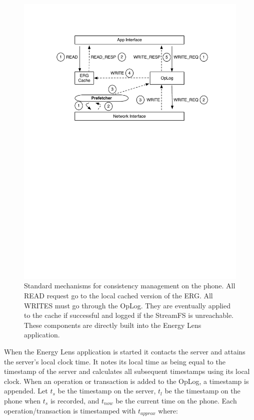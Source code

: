 \begin{figure}[htb!]
\begin{center}
\includegraphics[scale=0.80]{figs/standard_interaction}
\caption{Standard mechanisms for consistency management on the phone.  All READ request go to the local
cached version of the ERG.  All WRITES must go through the OpLog.
They are eventually applied to the cache
if successful and logged if the StreamFS is unreachable.  These components are directly built into the 
Energy Lens application.}
\label{fig:interactions}
\end{center}
\end{figure}

\label{sec:conflicts}
When the Energy Lens application is started it contacts the server and attains the server's local clock time. 
It notes its local time as being equal to the timestamp of the server and calculates all subsequent timestamps
using its local clock.  When an operation or transaction is added to the OpLog, a timestamp is appended.  Let $t_s$ be the timestamp 
on the server, $t_l$ be the timestamp on the phone when $t_s$ is recorded, and $t_{now}$ be the current time on the phone.  
Each operation/transaction is timestamped with $t_{approx}$ where:

